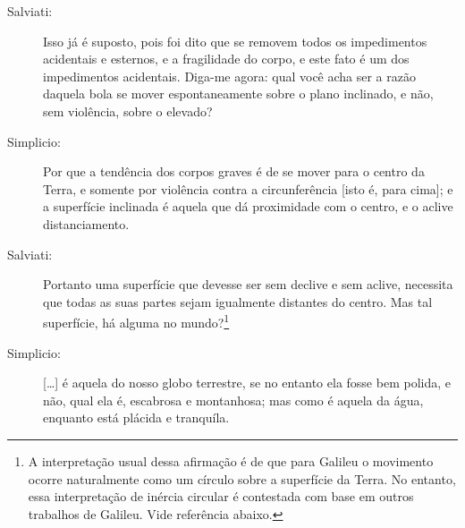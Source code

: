 \begin{description}
\item[Salviati:] Isso já é suposto, pois foi dito que se removem todos os impedimentos acidentais e esternos, e a fragilidade do corpo, e este fato é um dos impedimentos acidentais. Diga-me agora: qual você acha ser a razão  daquela bola se mover espontaneamente sobre o plano inclinado, e não, sem violência, sobre o elevado?

\item[Simplicio:] Por que a tendência dos corpos graves é de se mover para o centro da Terra, e somente por violência contra a circunferência [isto é, para cima]; e a superfície inclinada é aquela que dá proximidade com o centro, e o aclive distanciamento.

\item[Salviati:] Portanto uma superfície que devesse ser sem declive e sem aclive, necessita que todas as suas partes sejam igualmente distantes do centro. Mas tal superfície, há alguma no mundo?\footnote{A interpretação usual dessa afirmação é de que para Galileu o movimento ocorre naturalmente como um círculo sobre a superfície da Terra. No entanto, essa interpretação de inércia circular é contestada com base em outros trabalhos de Galileu. Vide referência abaixo.}\cite{VASCONCELOS2005}

\item[Simplicio:] [\dots] é aquela do nosso globo terrestre, se no entanto ela fosse bem polida, e não, qual ela é, escabrosa e montanhosa; mas como é aquela da água, enquanto está plácida e tranquíla.


\end{description}
